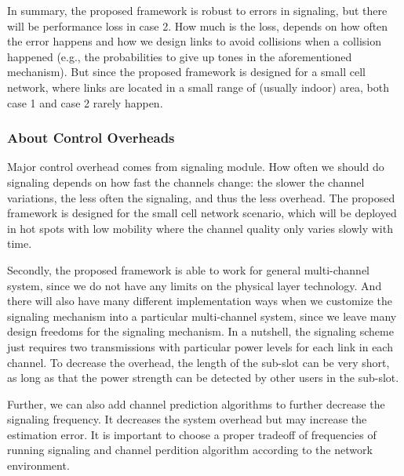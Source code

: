\documentclass[conference]{IEEEtran}
\begin{document}
In summary, the proposed framework is robust to errors in signaling, but there will be performance loss in case 2. How much is the loss, depends on how often the error happens and how we design links to avoid  collisions when a collision happened (e.g., the probabilities to give up tones in the aforementioned mechanism). But since the proposed framework is designed for a small cell network, where links are located in a small range of (usually indoor) area, both case 1 and case 2 rarely happen.

\subsubsection{About Control Overheads}
Major control overhead comes from signaling module. How often we should do signaling depends on how fast the channels change: the slower the channel variations, the less often the signaling, and thus the less overhead. The proposed framework is designed for the small cell network scenario, which will be deployed in hot spots with low mobility where the channel quality only varies slowly with time.

Secondly, the proposed framework is able to work for general multi-channel system, since we do not have any limits on the physical layer technology. And there will also have many different implementation ways when we customize the signaling mechanism into a particular multi-channel system, since we leave many design freedoms for the signaling mechanism.
In a nutshell, the signaling scheme just requires two transmissions  with particular power levels for each link in each channel. To decrease the overhead, the length of the sub-slot can be very short, as long as that the power strength can be detected by other users in the sub-slot.

Further, we can also add channel prediction algorithms to further decrease the signaling frequency. It decreases the system overhead but may increase the estimation error. It is important to choose a proper tradeoff of frequencies of running signaling and channel perdition algorithm according to the network environment.
\end{document}
